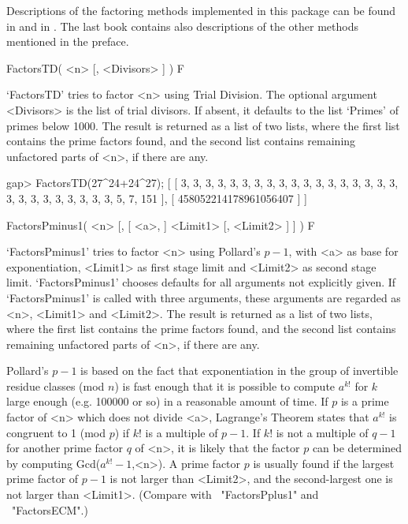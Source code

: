

Descriptions of the factoring methods implemented in this package can
be found in \cite{Bressoud89} and in \cite{Cohen93}.
The last book contains also descriptions of the other methods mentioned
in the preface.


\>FactorsTD( <n> [, <Divisors> ] ) F

`FactorsTD' tries to factor <n> using Trial Division.
The optional argument <Divisors> is the list of trial divisors.
If absent, it defaults to the list `Primes' of primes below 1000.
The result is returned as a list of two lists, where the first list
contains the prime factors found, and the second list contains
remaining unfactored parts of <n>, if there are any.

\beginexample
gap> FactorsTD(27^24+24^27);
[ [ 3, 3, 3, 3, 3, 3, 3, 3, 3, 3, 3, 3, 3, 3, 3, 3, 3, 3, 3, 3, 3, 3, 3, 3, 
      3, 3, 3, 5, 7, 151 ], [ 458052214178961056407 ] ]
\endexample


\>FactorsPminus1( <n> [, [ <a>, ] <Limit1> [, <Limit2> ] ] ) F

`FactorsPminus1' tries to factor <n> using Pollard's $p-1$, with <a>
as base for exponentiation, <Limit1> as first stage limit and <Limit2>
as second stage limit.
`FactorsPminus1' chooses defaults for all arguments not explicitly given.
If `FactorsPminus1' is called with three arguments, these arguments
are regarded as <n>, <Limit1> and <Limit2>.
The result is returned as a list of two lists, where the first list
contains the prime factors found, and the second list contains
remaining unfactored parts of <n>, if there are any.

Pollard's $p-1$ is based on the fact that exponentiation in the
group of invertible residue classes (mod $n$) is fast enough that
it is possible to compute $a^{k!}$ for $k$ large enough
(e.g. 100000 or so) in a reasonable amount of time.
If $p$ is a prime factor of <n> which does not divide <a>,
Lagrange's Theorem states that $a^{k!}$ is congruent to 1 (mod $p$) 
if $k!$ is a multiple of $p-1$.
If $k!$ is not a multiple of $q-1$ for another prime factor $q$ of <n>,
it is likely that the factor $p$ can be determined by computing
Gcd($a^{k!}-1$,<n>).
A prime factor $p$ is usually found if the largest prime factor
of $p-1$ is not larger than <Limit2>, and the second-largest one
is not larger than <Limit1>.
(Compare with ~"FactorsPplus1" and ~"FactorsECM".)

